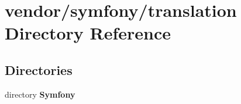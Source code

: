 \section{vendor/symfony/translation Directory Reference}
\label{dir_58c6b63fb171119d1f51bc25f0669c73}
\subsection*{Directories}
\begin{DoxyCompactItemize}
\item 
directory {\bf Symfony}
\end{DoxyCompactItemize}
